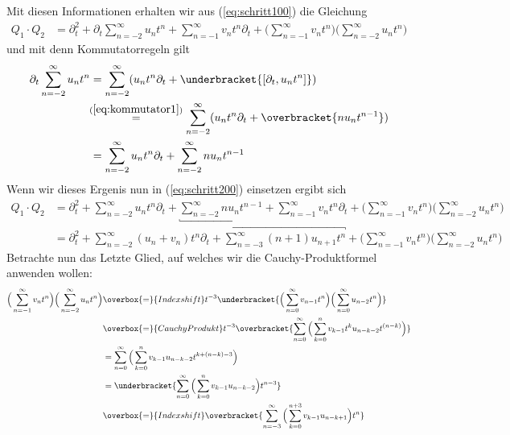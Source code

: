 Mit diesen Informationen erhalten wir aus (\ref{eq:schritt100}) die Gleichung
\begin{align} \label{eq:schritt200}
Q_1\cdot Q_2&=\partial_t^2 + \partial_t \sum_{n=-2}^\infty u_n t^n
  + \sum_{n=-1}^\infty v_nt^n \partial_t
  + \Big(\sum_{n=-1}^\infty v_nt^n \Big)\Big( \sum_{n=-2}^\infty u_n t^n \Big)
\end{align}
und mit denn Kommutatorregeln %
gilt
\begin{align*}
\partial_t \sum_{n=-2}^\infty u_n t^n &=
  \sum_{n=-2}^\infty (u_nt^n\partial_t + \underbracket{[\partial_t,u_nt^n]})
\\&\!\!\overset{{(\ref{eq:kommutator1})}}{=}
  \sum_{n=-2}^\infty (u_nt^n\partial_t +\overbracket{ nu_nt^{n-1}})
\\&= \sum_{n=-2}^\infty u_nt^n\partial_t + \sum_{n=-2}^\infty nu_nt^{n-1}
\end{align*}
Wenn wir dieses Ergenis nun in (\ref{eq:schritt200}) einsetzen ergibt sich
\begin{equation} \label{eq:schritt300}
  \begin{aligned}
Q_1\cdot Q_2&=\partial_t^2 + \sum_{n=-2}^\infty u_nt^n\partial_t
  + \underbracket{\sum_{n=-2}^\infty nu_nt^{n-1}}
  + \sum_{n=-1}^\infty v_nt^n \partial_t
  + \Big(\sum_{n=-1}^\infty v_nt^n \Big)\Big( \sum_{n=-2}^\infty u_n t^n \Big)
\\&=\partial_t^2 + \sum_{n=-2}^\infty (u_n+v_n)t^n \partial_t
  + \overbracket{\sum_{n=-3}^\infty (n+1)u_{n+1}t^{n}}
  + \Big(\sum_{n=-1}^\infty v_nt^n \Big)\Big( \sum_{n=-2}^\infty u_n t^n \Big)
  \end{aligned}
\end{equation}
Betrachte nun das Letzte Glied, auf welches wir die Cauchy-Produktformel
anwenden wollen: %
\begin{align*}
\Big(\sum_{n=-1}^\infty v_nt^n \Big)\Big( \sum_{n=-2}^\infty u_n t^n \Big)
  &\overbox{=}{Indexshift} t^{-3}
  \underbracket{\Big(\sum_{n=0}^\infty v_{n-1}t^{n} \Big)
  \Big( \sum_{n=0}^\infty u_{n-2} t^{n} \Big)}
\\&\overbox{=}{Cauchy Produkt} t^{-3} \overbracket{\sum_{n=0}^\infty
  \Big( \sum_{k=0}^n v_{k-1}t^{k} u_{n-k-2} t^{(n-k)} \Big)}
\\&= \sum_{n=0}^\infty \Big( \sum_{k=0}^n v_{k-1}u_{n-k-2}t^{k+(n-k)-3} \Big)
\\&= \underbracket{
  \sum_{n=0}^\infty \Big( \sum_{k=0}^n v_{k-1} u_{n-k-2} \Big) t^{n-3}}
\\&\overbox{=}{Indexshift} \overbracket{
  \sum_{n=-3}^\infty \Big( \sum_{k=0}^{n+3} v_{k-1} u_{n-k+1} \Big) t^{n} }
\end{align*}
